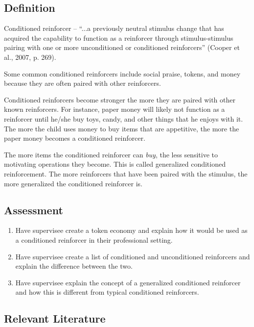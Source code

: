 \subsection{Definition}
Conditioned reinforcer – ``...a previously neutral stimulus change that has acquired the capability to function as a reinforcer through stimulus-stimulus pairing with one or more unconditioned or conditioned reinforcers'' (Cooper et al., 2007, p. 269).

Some common conditioned reinforcers include social praise, tokens, and money because they are often paired with other reinforcers. 

Conditioned reinforcers become stronger the more they are paired with other known reinforcers. For instance, paper money will likely not function as a reinforcer until he/she buy toys, candy, and other things that he enjoys with it. The more the child uses money to buy items that are appetitive, the more the paper money becomes a conditioned reinforcer.

The more items the conditioned reinforcer can \textit{buy}, the less sensitive to motivating operations they become. This is called generalized conditioned reinforcement. The more reinforcers that have been paired with the stimulus, the more generalized the conditioned reinforcer is.
%
\subsection{Assessment}
\begin{enumerate}
\item Have supervisee create a token economy and explain how it would be used as a conditioned reinforcer in their professional setting. 
\item Have supervisee create a list of conditioned and unconditioned reinforcers and explain the difference between the two. 
\item Have supervisee explain the concept of a generalized conditioned reinforcer and how this is different from typical conditioned reinforcers.
%
\end{enumerate}
%
\subsection{Relevant Literature}
\begin{refsection}
\nocite{test,alang2017police,clayton2018black}
\printbibliography[heading=none]
\end{refsection}
%
